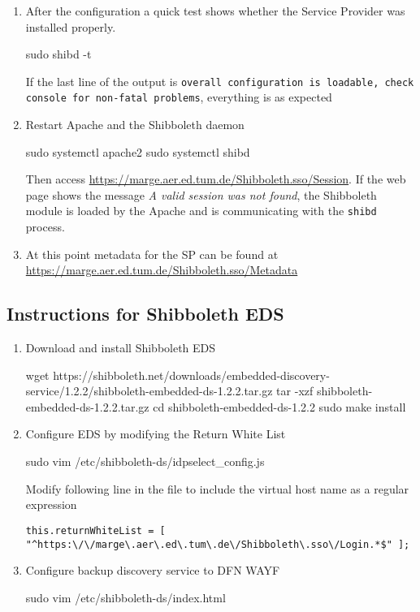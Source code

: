 \begin{enumerate}
    Activate the Shibboleth module in Apache
    \begin{terminal}
        sudo a2enmod shib
    \end{terminal}
    \item After the configuration a quick test shows whether the Service
    Provider was installed properly.
    \begin{terminal}
        sudo shibd -t
    \end{terminal}
    If the last line of the output is \texttt{overall configuration is loadable,
    check console for non-fatal problems}, everything is as expected
    \item Restart Apache and the Shibboleth daemon
    \begin{terminal}
	    sudo systemctl apache2 
        sudo systemctl shibd
    \end{terminal}
    Then access \url{https://marge.aer.ed.tum.de/Shibboleth.sso/Session}. If the
    web page shows the message \textit{A valid session was not found}, the
    Shibboleth module is loaded by the Apache and is communicating with the
    \texttt{shibd} process.
    \item At this point metadata for the SP can be found at
    \url{https://marge.aer.ed.tum.de/Shibboleth.sso/Metadata}
\end{enumerate}

\subsection{Instructions for Shibboleth EDS}

\begin{enumerate}
    \item Download and install Shibboleth EDS
    \begin{terminal}
        wget https://shibboleth.net/downloads/embedded-discovery-service/1.2.2/shibboleth-embedded-ds-1.2.2.tar.gz
        tar -xzf shibboleth-embedded-ds-1.2.2.tar.gz
        cd shibboleth-embedded-ds-1.2.2
        sudo make install
    \end{terminal}
    \item  Configure EDS by modifying the Return White List
    \begin{terminal}
        sudo vim /etc/shibboleth-ds/idpselect_config.js
    \end{terminal}
    Modify following line in the file to include the virtual host name as a
    regular expression
    \begin{lstlisting}[frame={l}]
        this.returnWhiteList = [ "^https:\/\/marge\.aer\.ed\.tum\.de\/Shibboleth\.sso\/Login.*$" ];
    \end{lstlisting}
    \item Configure backup discovery service to DFN WAYF
    \begin{terminal}
        sudo vim /etc/shibboleth-ds/index.html
    \end{terminal}
\end{enumerate}

